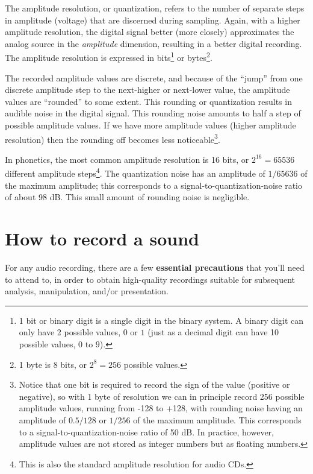 \documentclass[
]{book}
\begin{document}
The amplitude resolution, or quantization, refers to the number of separate steps in amplitude (voltage) that are discerned during sampling. Again, with a higher amplitude resolution, the digital signal better (more closely) approximates the analog source in the \emph{amplitude} dimension, resulting in a better digital recording. The amplitude resolution is expressed in bits\footnote{1 bit or binary digit is a single digit in the binary system. A binary digit can only have 2 possible values, \(0\) or \(1\) (just as a decimal digit can have 10 possible values, \(0\) to \(9\)).} or bytes\footnote{1 byte is 8 bits, or \(2^8=256\) possible values.}.

The recorded amplitude values are discrete, and because of the ``jump'' from one discrete amplitude step to the next-higher or next-lower value, the amplitude values are ``rounded'' to some extent. This rounding or quantization results in audible noise in the digital signal. This rounding noise amounts to half a step of possible amplitude values. If we have more amplitude values (higher amplitude resolution) then the rounding off becomes less noticeable\footnote{Notice that one bit is required to record the sign of the value (positive or negative), so with 1 byte of resolution we can in principle record 256 possible amplitude values, running from -128 to +128, with rounding noise having an amplitude of \(0.5/128\) or \(1/256\) of the maximum amplitude. This corresponds to a signal-to-quantization-noise ratio of 50 dB. In practice, however, amplitude values are not stored as integer numbers but as floating numbers.}.

In phonetics, the most common amplitude resolution is 16 bits, or \(2^{16} = 65536\) different amplitude steps\footnote{This is also the standard amplitude resolution for audio CDs.}. The quantization noise has an amplitude of \(1/65636\) of the maximum amplitude; this corresponds to a signal-to-quantization-noise ratio of about 98 dB. This small amount of rounding noise is negligible.

\section{How to record a sound}\label{sec:howtorecordsound}

For any audio recording, there are a few \textbf{essential precautions} that you'll need to attend to, in order to obtain high-quality recordings suitable for subsequent analysis, manipulation, and/or presentation.
\end{document}
